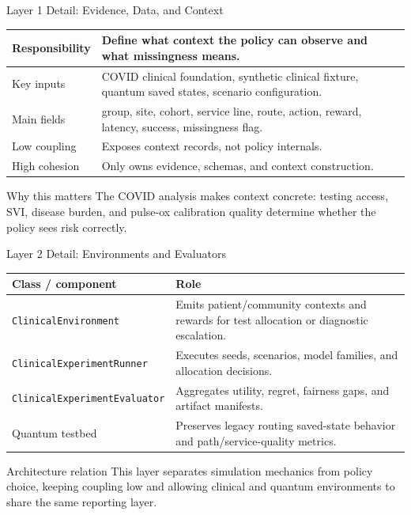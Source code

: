 \begin{frame}{Layer 1 Detail: Evidence, Data, and Context}
\small
\begin{tabular}{p{}p{}}
\toprule
Responsibility & Define what context the policy can observe and what missingness means. \\
\midrule
Key inputs & COVID clinical foundation, synthetic clinical fixture, quantum saved states, scenario configuration. \\
Main fields & group, site, cohort, service line, route, action, reward, latency, success, missingness flag. \\
Low coupling & Exposes context records, not policy internals. \\
High cohesion & Only owns evidence, schemas, and context construction. \\
\bottomrule
\end{tabular}
\vspace{0.6em}
\begin{block}{Why this matters}
The COVID analysis makes context concrete: testing access, SVI, disease burden, and pulse-ox calibration quality determine whether the policy sees risk correctly.
\end{block}
\end{frame}

\begin{frame}{Layer 2 Detail: Environments and Evaluators}
\small
\begin{tabular}{p{}p{}}
\toprule
Class / component & Role \\
\midrule
\texttt{ClinicalEnvironment} & Emits patient/community contexts and rewards for test allocation or diagnostic escalation. \\
\texttt{ClinicalExperimentRunner} & Executes seeds, scenarios, model families, and allocation decisions. \\
\texttt{ClinicalExperimentEvaluator} & Aggregates utility, regret, fairness gaps, and artifact manifests. \\
Quantum testbed & Preserves legacy routing saved-state behavior and path/service-quality metrics. \\
\bottomrule
\end{tabular}
\vspace{0.5em}
\begin{block}{Architecture relation}
This layer separates simulation mechanics from policy choice, keeping coupling low and allowing clinical and quantum environments to share the same reporting layer.
\end{block}
\end{frame}

